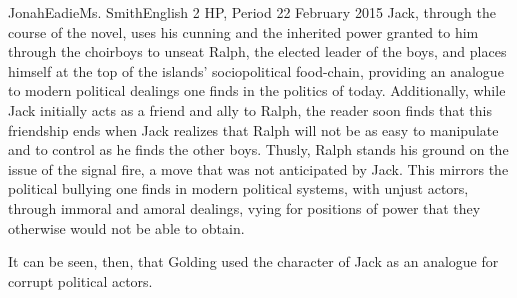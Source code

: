 \documentclass[12pt,letterpaper]{article}
\begin{document}
\begin{mla}{Jonah}{Eadie}{Ms. Smith}{English 2 HP, Period 2}{2 February 2015}
Jack, through the course of the novel, uses his cunning and the inherited 
power granted to him through the choirboys to unseat Ralph, the elected leader 
of the boys, and places himself at the top of the islands’ sociopolitical 
food-chain, providing an analogue to modern political dealings one finds in 
the politics of today. Additionally, while Jack initially acts as a friend and 
ally to Ralph, the reader soon finds that this friendship ends when Jack 
realizes that Ralph will not be as easy to manipulate and to control as he 
finds the other boys. Thusly, Ralph stands his ground on the issue of the 
signal fire, a move that was not anticipated by Jack. This mirrors the 
political bullying one finds in modern political systems, with unjust actors, 
through immoral and amoral dealings, vying for positions of power that they 
otherwise would not be able to obtain.

It can be seen, then, that Golding used the character of Jack as an analogue 
for corrupt political actors.


\end{mla}
\end{document}

